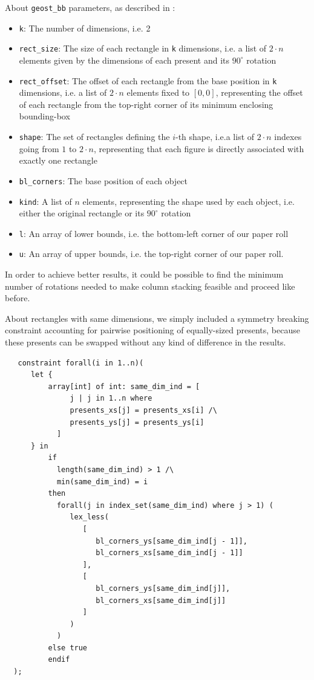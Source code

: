 \documentclass[a4paper,10pt]{article}
\begin{document}
About \texttt{geost\_bb} parameters, as described in \cite{geost}:
\begin{itemize}
   \item \texttt{k}: The number of dimensions, i.e. 2
   \item \texttt{rect\_size}: The size of each rectangle in \texttt{k} dimensions, i.e. a list of $2\cdot n$ elements given by the dimensions of each present and its $90^{\circ}$ rotation
   \item \texttt{rect\_offset}: The offset of each rectangle from the base position in \texttt{k}  dimensions, i.e. a list of $2\cdot n$ elements fixed to $[0,0]$, representing the offset of each rectangle from the top-right corner of its minimum enclosing bounding-box
   \item \texttt{shape}: The set of rectangles defining the $i$-th shape, i.e.a list of $2\cdot n$ indexes going from $1$ to $2\cdot n$, representing that each figure is directly associated with exactly one rectangle
   \item \texttt{bl\_corners}: The base position of each object
   \item \texttt{kind}: A list of $n$ elements, representing the shape used by each object, i.e. either the original rectangle or its $90^{\circ}$ rotation
   \item \texttt{l}: An array of lower bounds, i.e. the bottom-left corner of our paper roll
   \item \texttt{u}: An array of upper bounds, i.e. the top-right corner of our paper roll.
\end{itemize}

In order to achieve better results, it could be possible to find the minimum number of rotations needed to make column stacking feasible and proceed like before.

About rectangles with same dimensions, we simply included a symmetry breaking constraint accounting for pairwise positioning of equally-sized presents, because these presents can be swapped without any kind of difference in the results.

\begin{verbatim}
   constraint forall(i in 1..n)(
      let {
          array[int] of int: same_dim_ind = [
               j | j in 1..n where
               presents_xs[j] = presents_xs[i] /\
               presents_ys[j] = presents_ys[i]
            ]
      } in
          if
            length(same_dim_ind) > 1 /\
            min(same_dim_ind) = i
          then
            forall(j in index_set(same_dim_ind) where j > 1) (
               lex_less(
                  [
                     bl_corners_ys[same_dim_ind[j - 1]],
                     bl_corners_xs[same_dim_ind[j - 1]]
                  ],
                  [
                     bl_corners_ys[same_dim_ind[j]],
                     bl_corners_xs[same_dim_ind[j]]
                  ]
               )
            )
          else true
          endif
  );
\end{verbatim}
\end{document}
